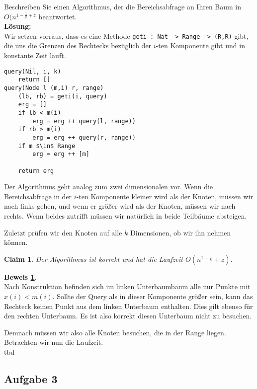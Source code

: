 \documentclass[11pt,a4paper,ngerman]{article}
\newtheorem{lemma}{\bfseries Claim}
\begin{document}
Beschreiben Sie einen Algorithmus, der die Bereichsabfrage an Ihren Baum in $O(n^{1-\frac{1}{k} + z}$ beantwortet.\\

\textbf{Lösung:}\\

Wir setzen vorraus, dass es eine Methode \lstinline|geti : Nat -> Range -> (R,R)| gibt,
die uns die Grenzen des Rechtecks bezüglich der $i$-ten Komponente gibt und in konstante Zeit läuft.

\begin{lstlisting}
query(Nil, i, k)
    return []
query(Node l (m,i) r, range)
    (lb, rb) = geti(i, query)
    erg = []
    if lb < m(i)
        erg = erg ++ query(l, range))
    if rb > m(i)
        erg = erg ++ query(r, range))
    if m $\in$ Range
        erg = erg ++ [m]

    return erg
\end{lstlisting}

Der Algorithmus geht analog zum zwei dimensionalen vor. Wenn die Bereichsabfrage in der $i$-ten Komponente kleiner wird als
der Knoten, müssen wir nach links gehen, und wenn er größer wird als der Knoten, müssen wir nach rechts.
Wenn beides zutrifft müssen wir natürlich in beide Teilbäume absteigen.

Zuletzt prüfen wir den Knoten auf alle $k$ Dimensionen, ob wir ihn nehmen können.\\

\begin{lemma}\label{alge:ueb10:kdquery}
    Der Algorithmus ist korrekt und hat die Laufzeit $O(n^{1-\frac{1}{k}} + z)$.
\end{lemma}

\textbf{Beweis \ref{alge:ueb10:kdquery}.}\\
    Nach Konstruktion befinden sich im linken Unterbaumbaum alle nur Punkte mit $x(i) < m(i)$. Sollte der
    Query als in dieser Komponente größer sein, kann das Rechteck keinen Punkt aus dem linken Unterbaum enthalten.
    Dies gilt ebenso für den rechten Unterbaum. Es ist also korrekt diesen Unterbaum nicht zu besuchen.

    Demnach müssen wir also alle Knoten besuchen, die in der Range liegen.\\

    Betrachten wir nun die Laufzeit.\\

    tbd  

\subsection*{Aufgabe 3}
\end{document}

